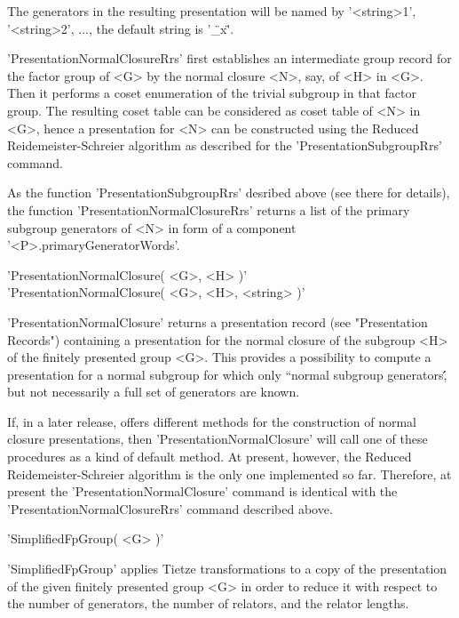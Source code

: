 The   generators  in   the  resulting   presentation  will  be  named  by
'<string>1', '<string>2', ..., the default string is '\"\_x\"'.

'PresentationNormalClosureRrs'  first  establishes an  intermediate group
record for the factor group of <G> by the normal closure <N>, say, of <H>
in <G>.  Then it performs a coset enumeration of  the trivial subgroup in
that factor group.  The resulting coset table  can be considered as coset
table  of  <N> in <G>, hence  a presentation for <N> can  be  constructed
using the  Reduced  Reidemeister-Schreier algorithm as  described for the
'PresentationSubgroupRrs' command.

As the  function 'PresentationSubgroupRrs' desribed  above (see there for
details),  the function 'PresentationNormalClosureRrs'  returns a list of
the  primary   subgroup  generators  of  <N>  in    form  of a  component
'<P>.primaryGeneratorWords'.

\vspace{5mm}
'PresentationNormalClosure( <G>, <H> )'%
 \\
'PresentationNormalClosure( <G>, <H>, <string> )'

'PresentationNormalClosure'   returns    a   presentation   record   (see
"Presentation Records") containing a presentation for the  normal closure
of the subgroup <H> of the finitely presented group <G>.  This provides a
possibility  to  compute  a presentation for a normal subgroup for  which
only ``normal  subgroup generators\'\', but not necessarily a full set of
generators are known.

If,  in  a  later  release,  {\GAP}  offers  different  methods  for  the
construction      of     normal     closure      presentations,      then
'PresentationNormalClosure' will call one of these  procedures as a  kind
of    default    method.     At    present,    however,    the    Reduced
Reidemeister-Schreier  algorithm  is  the only  one implemented  so  far.
Therefore,  at   present   the  'PresentationNormalClosure'   command  is
identical  with  the   'PresentationNormalClosureRrs'  command  described
above.


'SimplifiedFpGroup( <G> )'

'SimplifiedFpGroup'  applies  Tietze  transformations  to a  copy of  the
presentation of the given finitely presented group <G> in order to reduce
it with respect to  the number of generators, the number of relators, and
the relator lengths.

